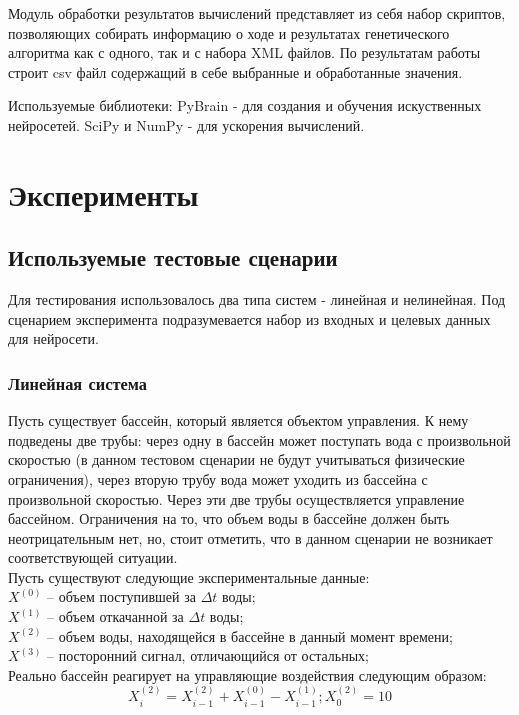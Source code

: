 \documentclass[utf8,usehyperref,12pt]{G7-32}
\begin{document}
Модуль обработки результатов вычислений представляет из себя набор скриптов, позволяющих собирать информацию о ходе и результатах генетического алгоритма как с одного, так и с набора XML файлов. По результатам работы строит csv файл содержащий в себе выбранные и обработанные значения.
 
Используемые библиотеки:
PyBrain - для создания и обучения искуственных нейросетей.
SciPy и NumPy - для ускорения вычислений.

\chapter{Эксперименты}
\section{Используемые тестовые сценарии}
Для тестирования использовалось два типа систем - линейная и нелинейная. Под сценарием эксперимента подразумевается набор из входных и целевых данных для нейросети.
\subsection{Линейная система}
Пусть существует бассейн, который является объектом управления. К нему подведены две трубы: через одну в бассейн может поступать вода с произвольной скоростью (в данном тестовом сценарии не будут учитываться физические ограничения), через вторую трубу вода может уходить из бассейна с произвольной скоростью. Через эти две трубы осуществляется управление бассейном. Ограничения на то, что объем воды в бассейне должен быть неотрицательным нет, но, стоит отметить, что в данном сценарии не возникает соответствующей ситуации.\\
Пусть существуют следующие экспериментальные данные:\\
$ X^{(0)} $ – объем поступившей за $ \Delta t $ воды;\\
$ X^{(1)} $ – объем откачанной за $ \Delta t $ воды;\\
$ X^{(2)} $ – объем воды, находящейся в бассейне в данный момент времени;\\
$ X^{(3)} $ – посторонний сигнал, отличающийся от остальных;\\
Реально бассейн реагирует на управляющие воздействия следующим образом:\\
\begin{equation}
X^{(2)}_{i} = X^{(2)}_{i-1} + X^{(0)}_{i-1} - X^{(1)}_{i-1}; X^{(2)}_{0}=10
\end{equation}
\end{document}
